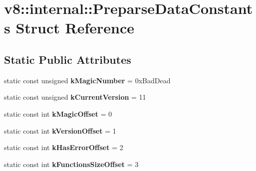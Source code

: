 \hypertarget{structv8_1_1internal_1_1_preparse_data_constants}{}\section{v8\+:\+:internal\+:\+:Preparse\+Data\+Constants Struct Reference}
\label{structv8_1_1internal_1_1_preparse_data_constants}
\subsection*{Static Public Attributes}
\begin{DoxyCompactItemize}
\item 
static const unsigned {\bfseries k\+Magic\+Number} = 0x\+Bad\+Dead\hypertarget{structv8_1_1internal_1_1_preparse_data_constants_a2d9db03979d91e5cca2f0a253d675b92}{}\label{structv8_1_1internal_1_1_preparse_data_constants_a2d9db03979d91e5cca2f0a253d675b92}

\item 
static const unsigned {\bfseries k\+Current\+Version} = 11\hypertarget{structv8_1_1internal_1_1_preparse_data_constants_aac35b6842e6018caf0c8916693ef176f}{}\label{structv8_1_1internal_1_1_preparse_data_constants_aac35b6842e6018caf0c8916693ef176f}

\item 
static const int {\bfseries k\+Magic\+Offset} = 0\hypertarget{structv8_1_1internal_1_1_preparse_data_constants_a455619b5fe3570f6d40ad72299d84fd6}{}\label{structv8_1_1internal_1_1_preparse_data_constants_a455619b5fe3570f6d40ad72299d84fd6}

\item 
static const int {\bfseries k\+Version\+Offset} = 1\hypertarget{structv8_1_1internal_1_1_preparse_data_constants_ac2f97000121f05f2c596c0d39ebf333a}{}\label{structv8_1_1internal_1_1_preparse_data_constants_ac2f97000121f05f2c596c0d39ebf333a}

\item 
static const int {\bfseries k\+Has\+Error\+Offset} = 2\hypertarget{structv8_1_1internal_1_1_preparse_data_constants_a7f479972328fe6b3f7bfc5ff4394883b}{}\label{structv8_1_1internal_1_1_preparse_data_constants_a7f479972328fe6b3f7bfc5ff4394883b}

\item 
static const int {\bfseries k\+Functions\+Size\+Offset} = 3\hypertarget{structv8_1_1internal_1_1_preparse_data_constants_aefaec23bad8ff778013dba953bb698f9}{}\label{structv8_1_1internal_1_1_preparse_data_constants_aefaec23bad8ff778013dba953bb698f9}


\end{DoxyCompactItemize}
